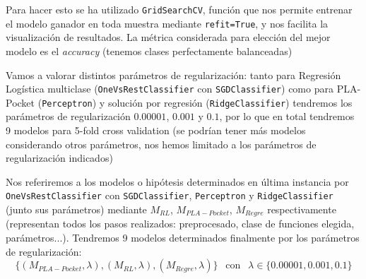 \documentclass[11pt,a4paper]{article}
\theoremstyle{definition}
\begin{document}
	Para hacer esto se ha utilizado \texttt{GridSearchCV}, función que nos permite entrenar el modelo ganador en toda muestra mediante \texttt{refit=True}, y nos facilita la visualización de resultados. La métrica considerada para elección del mejor modelo es el \textit{accuracy} (tenemos clases perfectamente balanceadas)
	
	Vamos a valorar distintos parámetros de regularización: tanto para Regresión Logística multiclase (\texttt{OneVsRestClassifier} con \texttt{SGDClassifier}) como para PLA-Pocket (\texttt{Perceptron}) y solución por regresión (\texttt{RidgeClassifier}) tendremos los parámetros de regularización $0.00001$, $0.001$ y $0.1$, por lo que en total tendremos 9 modelos para 5-fold cross validation (se podrían tener más modelos considerando otros parámetros, nos hemos limitado a los parámetros de regularización indicados)
	
	Nos referiremos a los modelos o hipótesis determinados en última instancia por \texttt{OneVsRestClassifier} con \texttt{SGDClassifier}, \texttt{Perceptron} y \texttt{RidgeClassifier} (junto sus parámetros) mediante $M_{RL}$, $M_{PLA-Pocket}$, $M_{Regre}$ respectivamente (representan todos los pasos realizados: preprocesado, clase de funciones elegida, parámetros...). Tendremos 9 modelos determinados finalmente por los parámetros de regularización: $$\{(M_{PLA-Pocket},\lambda),(M_{RL},\lambda), (M_{Regre},\lambda)\} \ \ \text{ con } \ \  \lambda \in \{0.00001, 0.001, 0.1\}$$
	
\end{document}
